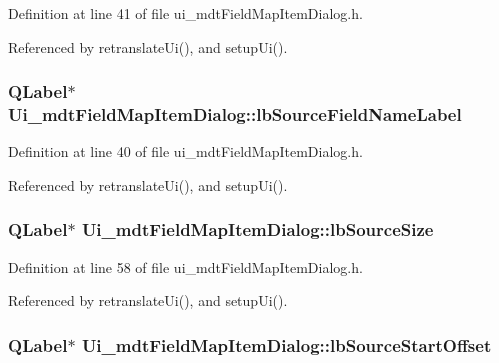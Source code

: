 Definition at line 41 of file ui\-\_\-mdt\-Field\-Map\-Item\-Dialog.\-h.



Referenced by retranslate\-Ui(), and setup\-Ui().

\hypertarget{class_ui__mdt_field_map_item_dialog_a5245255d699bb5e824231a1a64d96376}{
\subsubsection[{lb\-Source\-Field\-Name\-Label}]{\setlength{\rightskip}{0pt plus 5cm}Q\-Label$\ast$ Ui\-\_\-mdt\-Field\-Map\-Item\-Dialog\-::lb\-Source\-Field\-Name\-Label}}\label{class_ui__mdt_field_map_item_dialog_a5245255d699bb5e824231a1a64d96376}


Definition at line 40 of file ui\-\_\-mdt\-Field\-Map\-Item\-Dialog.\-h.



Referenced by retranslate\-Ui(), and setup\-Ui().

\hypertarget{class_ui__mdt_field_map_item_dialog_a6e0ff737d4394a56c61db6c6acbf9912}{
\subsubsection[{lb\-Source\-Size}]{\setlength{\rightskip}{0pt plus 5cm}Q\-Label$\ast$ Ui\-\_\-mdt\-Field\-Map\-Item\-Dialog\-::lb\-Source\-Size}}\label{class_ui__mdt_field_map_item_dialog_a6e0ff737d4394a56c61db6c6acbf9912}


Definition at line 58 of file ui\-\_\-mdt\-Field\-Map\-Item\-Dialog.\-h.



Referenced by retranslate\-Ui(), and setup\-Ui().

\hypertarget{class_ui__mdt_field_map_item_dialog_a8de120900000467db01cd104bf28904b}{
\subsubsection[{lb\-Source\-Start\-Offset}]{\setlength{\rightskip}{0pt plus 5cm}Q\-Label$\ast$ Ui\-\_\-mdt\-Field\-Map\-Item\-Dialog\-::lb\-Source\-Start\-Offset}}\label{class_ui__mdt_field_map_item_dialog_a8de120900000467db01cd104bf28904b}


